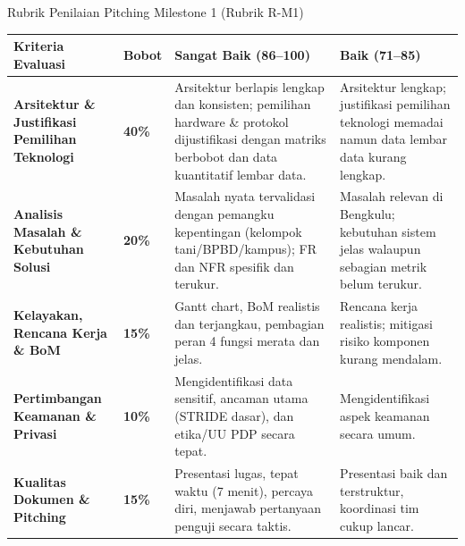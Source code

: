 \documentclass[aspectratio=169,10pt]{beamer}
\begin{document}
\begin{frame}{Rubrik Penilaian Pitching Milestone 1 (Rubrik R-M1)}
    \scriptsize
    \begin{tabularx}{\textwidth}{p{3.2cm} C{1.2cm} X X}
        \toprule
        \textbf{Kriteria Evaluasi} & \textbf{Bobot} & \textbf{Sangat Baik (86--100)} & \textbf{Baik (71--85)} \\
        \midrule
        \textbf{Arsitektur \& Justifikasi Pemilihan Teknologi} & \textbf{40\%} & Arsitektur berlapis lengkap dan konsisten; pemilihan hardware \& protokol dijustifikasi dengan matriks berbobot dan data kuantitatif lembar data. & Arsitektur lengkap; justifikasi pemilihan teknologi memadai namun data lembar data kurang lengkap. \\
        \addlinespace
        \textbf{Analisis Masalah \& Kebutuhan Solusi} & \textbf{20\%} & Masalah nyata tervalidasi dengan pemangku kepentingan (kelompok tani/BPBD/kampus); FR dan NFR spesifik dan terukur. & Masalah relevan di Bengkulu; kebutuhan sistem jelas walaupun sebagian metrik belum terukur. \\
        \addlinespace
        \textbf{Kelayakan, Rencana Kerja \& BoM} & \textbf{15\%} & Gantt chart, BoM realistis dan terjangkau, pembagian peran 4 fungsi merata dan jelas. & Rencana kerja realistis; mitigasi risiko komponen kurang mendalam. \\
        \addlinespace
        \textbf{Pertimbangan Keamanan \& Privasi} & \textbf{10\%} & Mengidentifikasi data sensitif, ancaman utama (STRIDE dasar), dan etika/UU PDP secara tepat. & Mengidentifikasi aspek keamanan secara umum. \\
        \addlinespace
        \textbf{Kualitas Dokumen \& Pitching} & \textbf{15\%} & Presentasi lugas, tepat waktu (7 menit), percaya diri, menjawab pertanyaan penguji secara taktis. & Presentasi baik dan terstruktur, koordinasi tim cukup lancar. \\
        \bottomrule
    \end{tabularx}
\end{frame}
\end{document}
